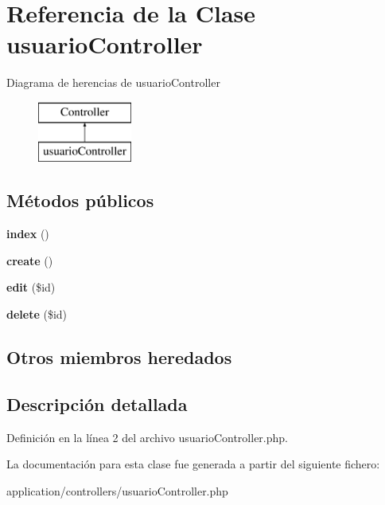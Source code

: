 \hypertarget{classusuario_controller}{}\section{Referencia de la Clase usuario\+Controller}
\label{classusuario_controller}
Diagrama de herencias de usuario\+Controller\begin{figure}[H]
\begin{center}
\leavevmode
\includegraphics[height=2.000000cm]{classusuario_controller}
\end{center}
\end{figure}
\subsection*{Métodos públicos}
\begin{DoxyCompactItemize}
\item 
\mbox{\label{classusuario_controller_abed0ba320d260f875b4f6cd9e5cc7e24}} 
{\bfseries index} ()
\item 
\mbox{\label{classusuario_controller_ad46c8f9bece790ccd1abfed2ee002c9f}} 
{\bfseries create} ()
\item 
\mbox{\label{classusuario_controller_a27bdbe0e4cf3836660d30e32cde8256e}} 
{\bfseries edit} (\$id)
\item 
\mbox{\label{classusuario_controller_a49ec16300510c5bfcb8589c9c96a1e31}} 
{\bfseries delete} (\$id)
\end{DoxyCompactItemize}
\subsection*{Otros miembros heredados}


\subsection{Descripción detallada}


Definición en la línea 2 del archivo usuario\+Controller.\+php.



La documentación para esta clase fue generada a partir del siguiente fichero\+:\begin{DoxyCompactItemize}
\item 
application/controllers/usuario\+Controller.\+php\end{DoxyCompactItemize}

